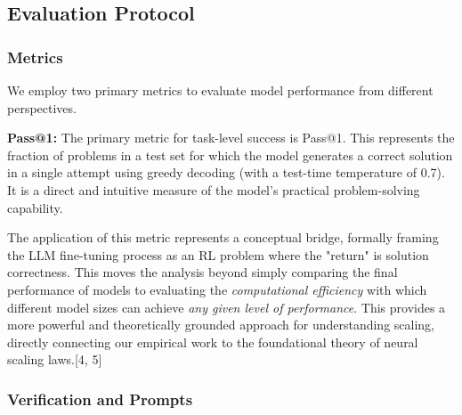 \subsection{Evaluation Protocol}

\subsubsection{Metrics}

We employ two primary metrics to evaluate model performance from different perspectives.

\textbf{Pass@1:} The primary metric for task-level success is Pass@1. This represents the fraction of problems in a test set for which the model generates a correct solution in a single attempt using greedy decoding (with a test-time temperature of 0.7). It is a direct and intuitive measure of the model's practical problem-solving capability.


The application of this metric represents a conceptual bridge, formally framing the LLM fine-tuning process as an RL problem where the "return" is solution correctness. This moves the analysis beyond simply comparing the final performance of models to evaluating the \textit{computational efficiency} with which different model sizes can achieve \textit{any given level of performance}. This provides a more powerful and theoretically grounded approach for understanding scaling, directly connecting our empirical work to the foundational theory of neural scaling laws.[4, 5]

\subsubsection{Verification and Prompts}

